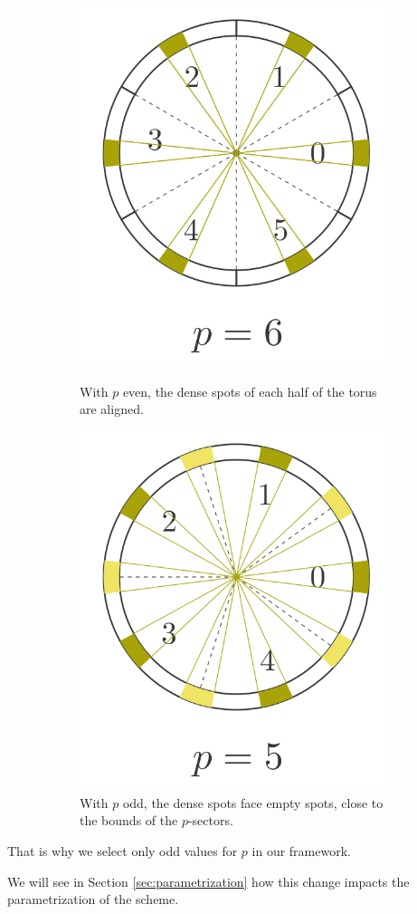 \begin{figure}
  \begin{subfigure}{0.49\linewidth}
    \    \centering
    \includegraphics[width=0.5\linewidth]{img/to_harmonize/torus_p_even.png}
    \caption{With $p$ even, the dense spots of each half of the torus are aligned.}
    \label{fig:torus_p_even}
  \end{subfigure}\hspace{1em}%
  \begin{subfigure}{0.49\linewidth}
    \centering
    \includegraphics[width=0.5\linewidth]{img/to_harmonize/torus_p_odd.png}
    \caption{With $p$ odd, the dense spots face empty spots, close to the bounds of the $p$-sectors.}
  \end{subfigure}
  \caption{}
  \label{fig:torus_p_even_vs_odd}
\end{figure}



That is why we select only odd values for $p$ in our framework. 


We will see in Section \ref{sec:parametrization} how this change impacts the parametrization of the scheme.

